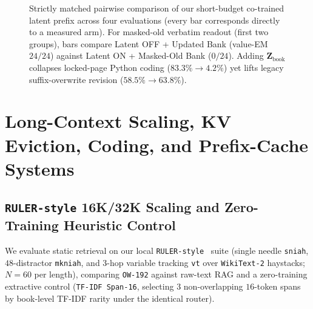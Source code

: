 \documentclass[11pt]{article}
\newcommand{\vect}[1]{\mathbf{#1}}
\renewcommand{\_}{\origunderscore\allowbreak}
\begin{document}
\begin{figure}[t]
\centering
{}
\caption{Strictly matched pairwise comparison of our short-budget co-trained latent prefix across four evaluations (every bar corresponds directly to a measured arm). For masked-old verbatim readout (first two groups), bars compare Latent OFF + Updated Bank (value-EM $24/24$) against Latent ON + Masked-Old Bank ($0/24$). Adding $\vect{Z}_{\text{book}}$ collapses locked-page Python coding ($83.3\% \rightarrow 4.2\%$) yet lifts legacy suffix-overwrite revision ($58.5\% \rightarrow 63.8\%$).}
\label{fig:latent_interaction}
\end{figure}

\section{Long-Context Scaling, KV Eviction, Coding, and Prefix-Cache Systems}
\label{sec:systems}

\subsection{\texttt{RULER-style} 16K/32K Scaling and Zero-Training Heuristic Control}
\label{sec:ruler}
We evaluate static retrieval on our local \texttt{RULER-style}~\cite{hsieh2024ruler} suite (single needle \texttt{s\_niah}, $48$-distractor \texttt{mk\_niah}, and $3$-hop variable tracking \texttt{vt} over \texttt{WikiText-2} haystacks; $N=60$ per length), comparing \texttt{OW-192} against raw-text RAG and a zero-training extractive control (\texttt{TF-IDF Span-16}, selecting $3$ non-overlapping $16$-token spans by book-level TF-IDF rarity under the identical router).
\end{document}
